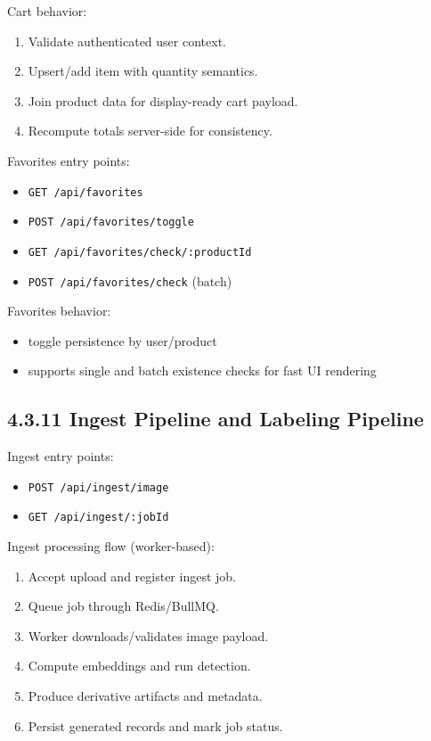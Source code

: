 \documentclass[12pt,a4paper]{report}
\begin{document}
Cart behavior:

\begin{enumerate}
\item Validate authenticated user context.
\item Upsert/add item with quantity semantics.
\item Join product data for display-ready cart payload.
\item Recompute totals server-side for consistency.
\end{enumerate}

Favorites entry points:

\begin{itemize}
\item \texttt{GET /api/favorites}
\item \texttt{POST /api/favorites/toggle}
\item \texttt{GET /api/favorites/check/:productId}
\item \texttt{POST /api/favorites/check} (batch)
\end{itemize}

Favorites behavior:

\begin{itemize}
\item toggle persistence by user/product
\item supports single and batch existence checks for fast UI rendering
\end{itemize}

\subsection{4.3.11 Ingest Pipeline and Labeling Pipeline}
Ingest entry points:

\begin{itemize}
\item \texttt{POST /api/ingest/image}
\item \texttt{GET /api/ingest/:jobId}
\end{itemize}

Ingest processing flow (worker-based):

\begin{enumerate}
\item Accept upload and register ingest job.
\item Queue job through Redis/BullMQ.
\item Worker downloads/validates image payload.
\item Compute embeddings and run detection.
\item Produce derivative artifacts and metadata.
\item Persist generated records and mark job status.
\end{enumerate}
\end{document}

